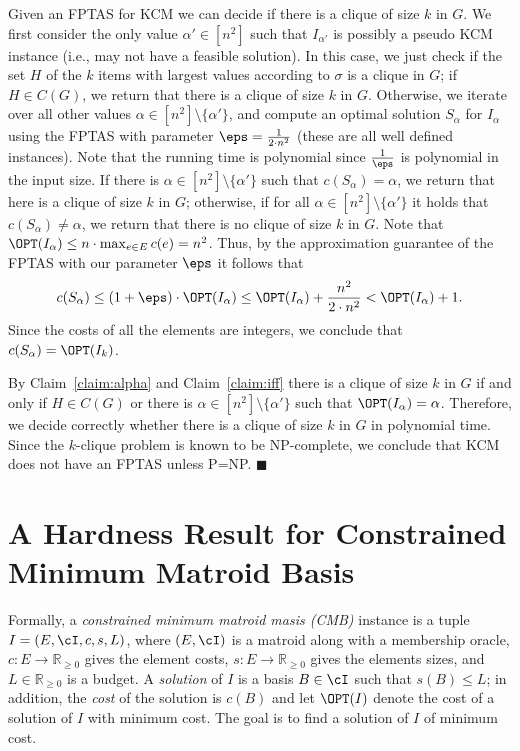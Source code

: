 {Given an FPTAS for KCM we can decide if there is a clique of size $k$ in $G$. We first consider the only value  $\alpha' \in [n^2]$ such that $I_{\alpha'}$ is possibly a pseudo KCM instance (i.e., may not have a feasible solution). In this case, we just check if the set $H$ of the $k$ items with largest values according to $\sigma$ is a clique in $G$; if $H \in C(G)$, we return that there is a clique of size $k$ in $G$. Otherwise, we iterate over all other values $\alpha \in  [n^2] \setminus \{\alpha'\}$, and compute an optimal solution $S_{\alpha}$ for $I_{\alpha}$ using the FPTAS with parameter $\eps = \frac{1}{2 \cdot n^2}$ (these are all well defined instances). Note that the running time is polynomial since $\frac{1}{\eps}$ is polynomial in the input size. If there is $\alpha \in  [n^2] \setminus \{\alpha'\}$ such that $c(S_{\alpha}) = \alpha$, we return that here is a clique of size $k$ in $G$; otherwise, if for all $\alpha \in  [n^2] \setminus \{\alpha'\}$  it holds that  $c(S_{\alpha}) \neq \alpha$, we return that there is no clique of size $k$ in $G$. Note that $\OPT(I_{\alpha}) \leq n \cdot \max_{e \in E} c(e) = n^2$. Thus, 
by the approximation guarantee of the FPTAS with our parameter $\eps$ it follows that $$c(S_{\alpha}) \leq (1+\eps) \cdot \OPT(I_{\alpha}) \leq \OPT(I_{\alpha}) + \frac{n^2}{2 \cdot n^2} < \OPT(I_{\alpha})+1.$$ Since the costs of all the elements are integers, we conclude that $c(S_{\alpha}) = \OPT(I_k)$. %

By Claim~\ref{claim:alpha} and Claim~\ref{claim:iff} there is a clique of size $k$ in $G$ if and only if $H \in C(G)$ or there is $\alpha \in [n^2] \setminus \{\alpha'\}$ such that $\OPT(I_{\alpha}) = \alpha$. Therefore, we decide correctly whether there is a clique of size $k$ in $G$ in polynomial time. Since the $k$-clique problem is known to be NP-complete, we conclude that KCM does not have an FPTAS unless P=NP.
$\blacksquare$



\section{A Hardness Result for Constrained Minimum Matroid Basis}

Formally, a {\em  constrained minimum matroid masis (CMB)} instance is a tuple $I =  (E,\cI,c,s,L)$, where $(E,\cI)$ is a matroid along with a membership oracle, $c:E \rightarrow \mathbb{R}_{\geq 0}$  gives the element costs, $s:E \rightarrow \mathbb{R}_{\geq 0}$ gives the elements sizes, and $L \in \mathbb{R}_{\geq 0}$ is a budget. A {\em solution} of $I$ is a basis $B \in \cI$ such that $s(B) \leq L$; in addition, the {\em cost} of the solution is $c(B)$ and let $\OPT(I)$ denote the cost of a solution of $I$ with minimum cost. The goal is to find a solution of $I$ of minimum cost. 


}
